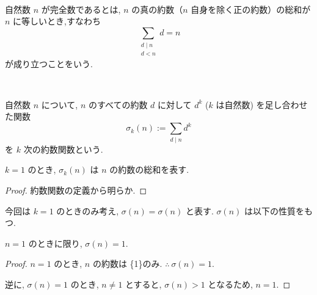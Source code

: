 %

\begin{definition}[完全数]\label{perfect}\leanok~\

自然数 \(n\) が完全数であるとは, \(n\) の真の約数（\(n\) 自身を除く正の約数）の総和が \(n\) に等しいとき,すなわち
\[
\sum_{\substack{d \mid n\\ d < n}} d = n
\]
が成り立つことをいう.

\end{definition}


\begin{definition}[約数関数]\label{sigma_div}\leanok~\

自然数 \(n\) について, \(n\) のすべての約数 \(d\) に対して \(d^k\) (\(k\) は自然数) を足し合わせた関数
\[
\sigma_k(n) := \sum_{d \mid n} d^k
\]
を \(k\) 次の約数関数という.

\end{definition}


\begin{lemma}\label{sigma_one_apply}\leanok{}
\(k = 1\) のとき, \(\sigma_k(n)\) は \(n\) の約数の総和を表す.
\end{lemma}

\begin{proof}
約数関数の定義から明らか.
\end{proof}


今回は \(k = 1\) のときのみ考え, \(\sigma(n) = \sigma(n)\) と表す.
\(\sigma(n)\) は以下の性質をもつ.


\begin{lemma}\label{one_iff_sum_divisors_eq_one}
\leanok{}
\(n = 1\) のときに限り, \(\sigma(n) = 1\).
\end{lemma}

\begin{proof}
\(n = 1\) のとき, \(n\) の約数は \{1\}のみ. \(\therefore ~\sigma(n) = 1\).

逆に, \(\sigma(n) = 1\) のとき, \(n \neq 1\) とすると, \(\sigma(n) > 1\) となるため, \(n = 1\).
\end{proof}


